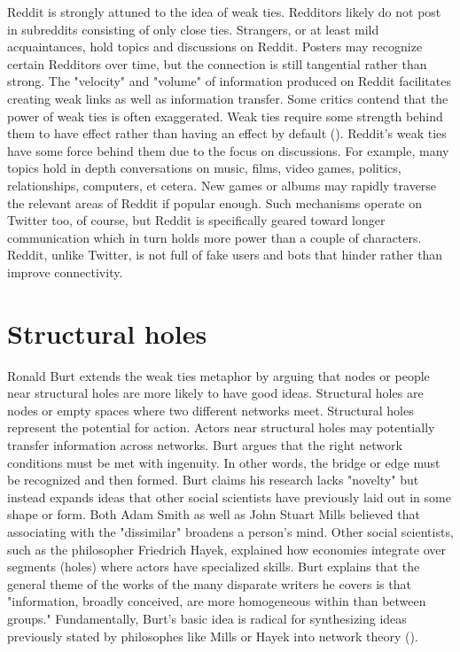 \documentclass[12pt, a4paper]{article}
\begin{document}
Reddit is strongly attuned to the idea of weak ties. Redditors likely do not post in subreddits consisting of only close ties. Strangers, or at least mild acquaintances, hold topics and discussions on Reddit. Posters may recognize certain Redditors over time, but the connection is still tangential rather than strong. The "velocity" and "volume" of information produced on Reddit facilitates creating weak links as well as information transfer. Some critics contend that the power of weak ties is often exaggerated. Weak ties require some strength behind them to have effect rather than having an effect by default (\cite{kadushin2011}). Reddit's weak ties have some force behind them due to the focus on discussions. For example, many topics hold in depth conversations on music, films, video games, politics, relationships, computers, et cetera. New games or albums may rapidly traverse the relevant areas of Reddit if popular enough. Such mechanisms operate on Twitter too, of course, but Reddit is specifically geared toward longer communication which in turn holds more power than a couple of characters. Reddit, unlike Twitter, is not full of fake users and bots that hinder rather than improve connectivity.

\section{Structural holes}
Ronald Burt extends the weak ties metaphor by arguing that nodes or people near structural holes are more likely to have good ideas. Structural holes are nodes or empty spaces where two different networks meet. Structural holes represent the potential for action. Actors near structural holes may potentially transfer information across networks. Burt argues that the right network conditions must be met with ingenuity. In other words, the bridge or edge must be recognized and then formed. Burt claims his research lacks "novelty" but instead expands ideas that other social scientists have previously laid out in some shape or form. Both Adam Smith as well as John Stuart Mills believed that associating with the "dissimilar" broadens a person's mind. Other social scientists, such as the philosopher Friedrich Hayek, explained how economies integrate over segments (holes) where actors have specialized skills. Burt explains that the general theme of the works of the many disparate writers he covers is that "information, broadly conceived, are more homogeneous within than between groups." Fundamentally, Burt's basic idea is radical for synthesizing ideas previously stated by philosophes like Mills or Hayek into network theory (\cite{burt2004}).
\end{document}

